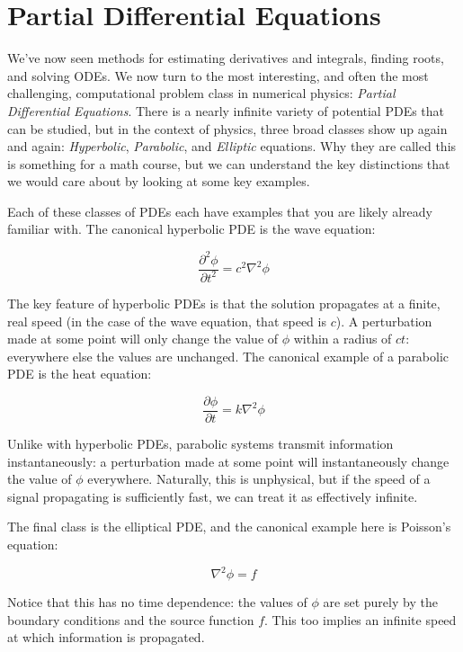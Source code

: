 \documentclass{article}
\theoremstyle{demo}
\begin{document}
\section{Partial Differential Equations}
We've now seen methods for estimating derivatives and integrals, finding roots,
and solving ODEs.  We now turn to the most interesting, and often the most
challenging, computational problem class in numerical physics: \textit{Partial
Differential Equations}.  There is a nearly infinite variety of potential PDEs
that can be studied, but in the context of physics, three broad classes show up
again and again: \textit{Hyperbolic}, \textit{Parabolic}, and \textit{Elliptic}
equations.  Why they are called this is something for a math course, but we can
understand the key distinctions that we would care about by looking at some key
examples.

Each of these classes of PDEs each have examples that you are likely
already familiar with.  The canonical hyperbolic PDE is the wave equation:

\begin{equation}
    \frac{\partial^2 \phi}{\partial t^2} = c^2 \nabla^2 \phi
\end{equation}

The key feature of hyperbolic PDEs is that the solution propagates at a finite,
real speed (in the case of the wave equation, that speed is $c$).  A
perturbation made at some point will only change the value of $\phi$ within a
radius of $ct$: everywhere else the values are unchanged. The canonical
example of a parabolic PDE is the heat equation:

\begin{equation}
    \frac{\partial \phi}{\partial t} = k \nabla^2 \phi
\end{equation}

Unlike with hyperbolic PDEs, parabolic systems transmit information
instantaneously: a perturbation made at some point will instantaneously change
the value of $\phi$ everywhere.  Naturally, this is unphysical, but if the speed
of a signal propagating is sufficiently fast, we can treat it as effectively
infinite.

The final class is the elliptical PDE, and the canonical example here is
Poisson's equation:

\begin{equation}
    \nabla^2 \phi = f
\end{equation}

Notice that this has no time dependence: the values of $\phi$ are set purely by
the boundary conditions and the source function $f$.  This too implies an
infinite speed at which information is propagated.
\end{document}
